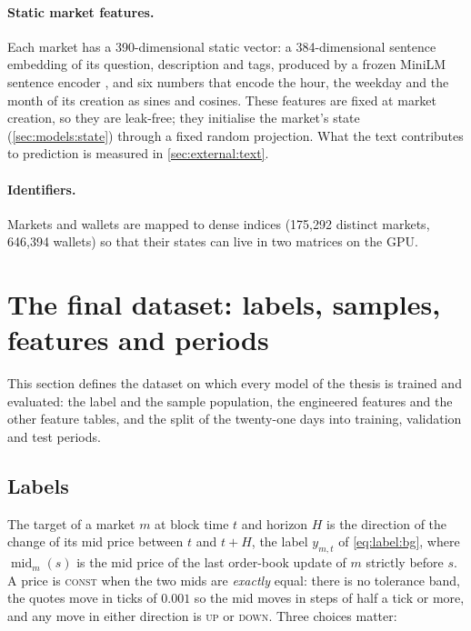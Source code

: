 \paragraph{Static market features.}  Each market has a 390-dimensional static vector:
a 384-dimensional sentence embedding of its question, description and tags, produced by a
frozen MiniLM sentence encoder \cite{reimers2019sbert}, and six numbers that encode the
hour, the weekday and the month of its creation as sines and cosines.  These features are
fixed at market creation, so they are leak-free; they initialise the market's state
(\cref{sec:models:state}) through a fixed random projection.  What the text contributes
to prediction is measured in \cref{sec:external:text}.

\paragraph{Identifiers.}  Markets and wallets are mapped to dense indices
(175{,}292 distinct markets, 646{,}394 wallets) so that their states can live in two matrices on
the GPU.

\section{The final dataset: labels, samples, features and periods}
\label{sec:data:final}

This section defines the dataset on which every model of the thesis is trained and
evaluated: the label and the sample population, the engineered features and the other
feature tables, and the split of the twenty-one days into training, validation and test
periods.

\subsection{Labels}
\label{sec:data:labels}

The target of a market $m$ at block time $t$ and horizon $H$ is the direction of the
change of its mid price between $t$ and $t + H$, the label $y_{m,t}$ of
\cref{eq:label:bg}, where $\operatorname{mid}_m(s)$ is the mid price of the last
order-book update of $m$ strictly before $s$.  A price is \textsc{const} when the two mids are \emph{exactly}
equal: there is no tolerance band, the quotes move in ticks of $0.001$ so the mid moves in
steps of half a tick or more, and any move in either direction is \textsc{up} or \textsc{down}.  Three choices matter:

